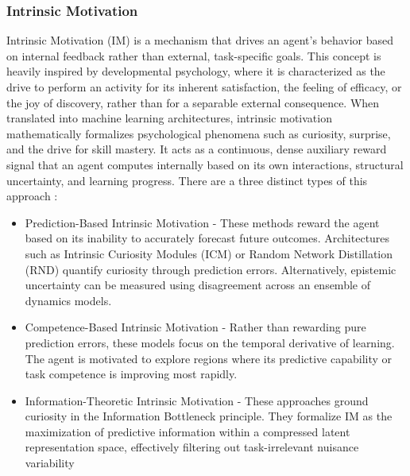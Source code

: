 \subsubsection{Intrinsic Motivation}
Intrinsic Motivation (IM) is a mechanism that drives an agent's behavior based on internal feedback rather than external, task-specific goals. This concept is heavily inspired by developmental psychology, where it is characterized as the drive to perform an activity for its inherent satisfaction, the feeling of efficacy, or the joy of discovery, rather than for a separable external consequence. When translated into machine learning architectures, intrinsic motivation mathematically formalizes psychological phenomena such as curiosity, surprise, and the drive for skill mastery. It acts as a continuous, dense auxiliary reward signal that an agent computes internally based on its own interactions, structural uncertainty, and learning progress. There are a three distinct types of this approach \cite{intrinsic_motivation_of_RL} \cite{Information-Theoretic_intrinsic_motivation_of_RL}:
\begin{itemize}
	\item Prediction-Based Intrinsic Motivation - These methods reward the agent based on its inability to accurately forecast future outcomes. Architectures such as Intrinsic Curiosity Modules (ICM) or Random Network Distillation (RND) quantify curiosity through prediction errors. Alternatively, epistemic uncertainty can be measured using disagreement across an ensemble of dynamics models.
	\item Competence-Based Intrinsic Motivation - Rather than rewarding pure prediction errors, these models focus on the temporal derivative of learning. The agent is motivated to explore regions where its predictive capability or task competence is improving most rapidly.
	\item Information-Theoretic Intrinsic Motivation - These approaches ground curiosity in the Information Bottleneck principle. They formalize IM as the maximization of predictive information within a compressed latent representation space, effectively filtering out task-irrelevant nuisance variability
\end{itemize} 

